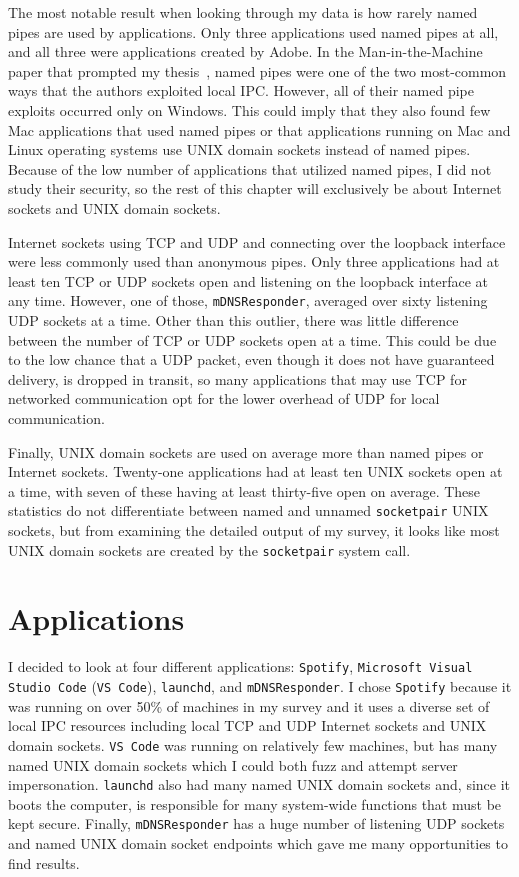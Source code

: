 The most notable result when looking through my data is how rarely named pipes are used by applications.  Only three applications used named pipes at all, and all three were applications created by Adobe.  In the Man-in-the-Machine paper that prompted my thesis~\cite{MitMa}, named pipes were one of the two most-common ways that the authors exploited local IPC.  However, all of their named pipe exploits occurred only on Windows.  This could imply that they also found few Mac applications that used named pipes or that applications running on Mac and Linux operating systems use UNIX domain sockets instead of named pipes.  Because of the low number of applications that utilized named pipes, I did not study their security, so the rest of this chapter will exclusively be about Internet sockets and UNIX domain sockets.

Internet sockets using TCP and UDP and connecting over the loopback interface were less commonly used than anonymous pipes.  Only three applications had at least ten TCP or UDP sockets open and listening on the loopback interface at any time.  However, one of those, \texttt{mDNSResponder}, averaged over sixty listening UDP sockets at a time.  Other than this outlier, there was little difference between the number of TCP or UDP sockets open at a time.  This could be due to the low chance that a UDP packet, even though it does not have guaranteed delivery, is dropped in transit, so many applications that may use TCP for networked communication opt for the lower overhead of UDP for local communication.

Finally, UNIX domain sockets are used on average more than named pipes or Internet sockets.  Twenty-one applications had at least ten UNIX sockets open at a time, with seven of these having at least thirty-five open on average.  These statistics do not differentiate between named and unnamed \texttt{socketpair} UNIX sockets, but from examining the detailed output of my survey, it looks like most UNIX domain sockets are created by the \texttt{socketpair} system call.

\section{Applications}
\label{sec:applications}
I decided to look at four different applications: \texttt{Spotify}, \texttt{Microsoft Visual Studio Code} (\texttt{VS Code}), \texttt{launchd}, and \texttt{mDNSResponder}.  I chose \texttt{Spotify} because it was running on over 50\% of machines in my survey and it uses a diverse set of local IPC resources including local TCP and UDP Internet sockets and UNIX domain sockets.  \texttt{VS Code} was running on relatively few machines, but has many named UNIX domain sockets which I could both fuzz and attempt server impersonation.  \texttt{launchd} also had many named UNIX domain sockets and, since it boots the computer, is responsible for many system-wide functions that must be kept secure.  Finally, \texttt{mDNSResponder} has a huge number of listening UDP sockets and named UNIX domain socket endpoints which gave me many opportunities to find results.

